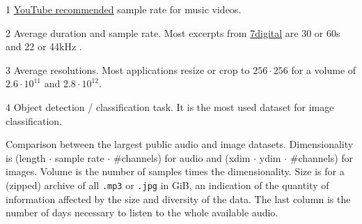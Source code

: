 \documentclass{article}
\begin{document}
\begin{table}[t]
\begin{threeparttable}
	\begin{tablenotes}
		\item[1] \href{https://support.google.com/youtube/answer/6039860}{YouTube recommended} sample rate for music videos.
		\item[2] Average duration and sample rate. Most excerpts from \href{https://www.7digital.com}{7digital} are 30 or 60s and 22 or 44kHz \cite{msd_features}.
		\item[3] Average resolutions. Most applications resize or crop to $256\cdot256$ for a volume of $2.6\cdot10^{11}$ and $2.8\cdot10^{12}$.
		\item[4] Object detection / classification task. It is the most used dataset for image classification.
	\end{tablenotes}
	\end{threeparttable}
	\caption{Comparison between the largest public audio and image datasets. Dimensionality is (length $\cdot$ sample rate $\cdot$ \#channels) for audio and (xdim $\cdot$ ydim $\cdot$ \#channels) for images. Volume is the number of samples times the dimensionality. Size is for a (zipped) archive of all \texttt{.mp3} or \texttt{.jpg} in GiB, an indication of the quantity of information affected by the size and diversity of the data. The last column is the number of days necessary to listen to the whole available audio.}
	\label{tab:size}
\end{table}

\end{document}

